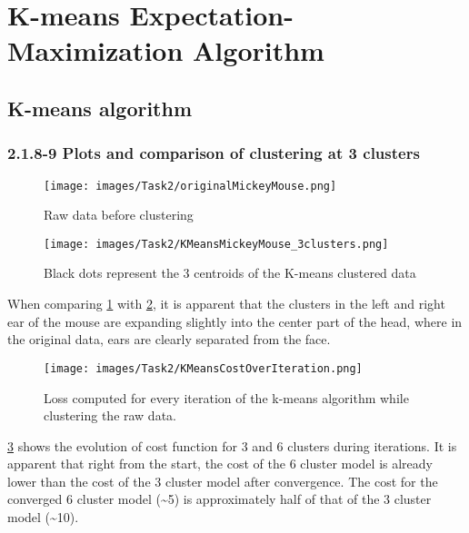 \section{K-means Expectation-Maximization Algorithm}

\subsection{K-means algorithm}

\subsubsection*{2.1.8-9 Plots and comparison of clustering at 3 clusters}


\begin{figure}[H]
	\centering
	\texttt{[image: images/Task2/originalMickeyMouse.png]}
	\caption{Raw data before clustering}
	\label{fig:rawData}
\end{figure}




\begin{figure}[H]
	\centering
	\texttt{[image: images/Task2/KMeansMickeyMouse\_3clusters.png]}
	\caption{Black dots represent the 3 centroids of the K-means clustered data}
	\label{fig:KMClusteredData3}
\end{figure}

When comparing \cref{fig:rawData} with \cref{fig:KMClusteredData3}, it is apparent that the clusters in the left and right ear of the mouse are expanding slightly into the center part of the head, where in the original data, ears are clearly separated from the face. 

\begin{figure}[H]
	\centering
	\texttt{[image: images/Task2/KMeansCostOverIteration.png]}
	\caption{Loss computed for every iteration of the k-means algorithm while clustering the raw data.}
	\label{fig:KMCostOverIteration}
\end{figure}


\cref{fig:KMCostOverIteration} shows the evolution of cost function for 3 and 6 clusters during iterations. It is apparent that right from the start, the cost of the 6 cluster model is already lower than the cost of the 3 cluster model after convergence. The cost for the converged 6 cluster model (\textasciitilde 5) is approximately half of that of the 3 cluster model (\textasciitilde 10).





